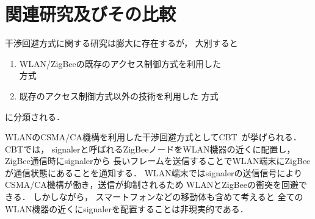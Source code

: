 \documentclass[12pt]{jreport}
\begin{document}

\chapter{関連研究及びその比較}\label{relation}%
干渉回避方式に関する研究は膨大に存在するが，
大別すると
\begin{enumerate}

 \item WLAN/ZigBeeの既存のアクセス制御方式を利用した\\
 方式~\cite{hou09:minimize_intf,zhang11:zigbee_wifi_coexist,murata14:wlan_zigbee,huang09:wlan_zigbee,tytgat12:wlan_zigbee}

 \item 既存のアクセス制御方式以外の技術を利用した
 方式~\cite{huang10:beyond_coexist,liang10:wifi_zigbee_survive}

\end{enumerate}
に分類される．

WLANのCSMA/CA機構を利用した干渉回避方式としてCBT~\cite{zhang11:zigbee_wifi_coexist}が挙げられる．
CBTでは，
signalerと呼ばれるZigBeeノードをWLAN機器の近くに配置し，ZigBee通信時にsignalerから
長いフレームを送信することでWLAN端末にZigBeeが通信状態にあることを通知する．
WLAN端末ではsignalerの送信信号によりCSMA/CA機構が働き，送信が抑制されるため
WLANとZigBeeの衝突を回避できる．
しかしながら，
スマートフォンなどの移動体も含めて考えると
全てのWLAN機器の近くにsignalerを配置することは非現実的である．
\end{document}

